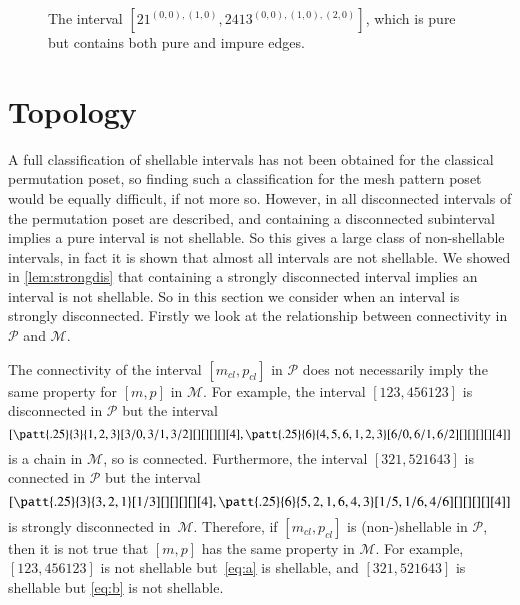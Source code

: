 \documentclass[preprint,11pt]{elsarticle}
\newcommand\cl[1]{#1_{cl}}
\numberwithin{equation}{section}
\numberwithin{figure}{section}
\numberwithin{thm}{section}
\begin{document}
\begin{figure}\centering
{}
\caption{The interval $[21^{(0,0),(1,0)},2413^{(0,0),(1,0),(2,0)}]$,
 which is pure but contains both pure and impure edges.}
 \label{fig:pureIm}
\end{figure}

\section{Topology}\label{sec:topology}
A full classification of shellable intervals has not been obtained for the classical permutation
poset, so finding such a classification for the mesh pattern poset would be equally difficult, if not more so.
However, in \cite{McSt13} all disconnected intervals of the permutation poset are described, and containing a disconnected subinterval
implies a pure interval is not shellable. So this gives a large class of non-shellable intervals, in fact
it is shown that almost all intervals are not shellable. We showed in \cref{lem:strongdis} that containing a strongly
disconnected interval implies an interval is not shellable. So in this section we consider
when an interval is strongly disconnected. Firstly we look at the relationship between connectivity
in $\mathcal{P}$ and $\mathcal{M}$.

The connectivity of the interval $[\cl{m},\cl{p}]$ in $\mathcal{P}$ does not
necessarily imply the same property for $[m,p]$ in $\mathcal{M}$. For example,
the interval $[123,456123]$ is disconnected in $\mathcal{P}$ but the interval
\begin{equation}\label{eq:a}\left[\patt{.25}{3}{1,2,3}[3/0,3/1,3/2][][][][][4]
,\patt{.25}{6}{4,5,6,1,2,3}[6/0,6/1,6/2][][][][][4]\right]\end{equation} 
is a chain in $\mathcal{M}$, so is connected. Furthermore, the interval
$[321,521643]$ is connected in $\mathcal{P}$ but the interval
\begin{equation}\label{eq:b}\left[\patt{.25}{3}{3,2,1}[1/3][][][][][4],
\patt{.25}{6}{5,2,1,6,4,3}[1/5,1/6,4/6][][][][][4]\right]\end{equation}
is strongly disconnected in~$\mathcal{M}$. Therefore, if $[\cl{m},\cl{p}]$
is (non-)shellable in $\mathcal{P}$, then it is not true that $[m,p]$ has
the same property in $\mathcal{M}$. For example, $[123,456123]$ is not
shellable but~\eqref{eq:a} is shellable, and $[321,521643]$ is shellable
but \eqref{eq:b} is not shellable.
\end{document}
